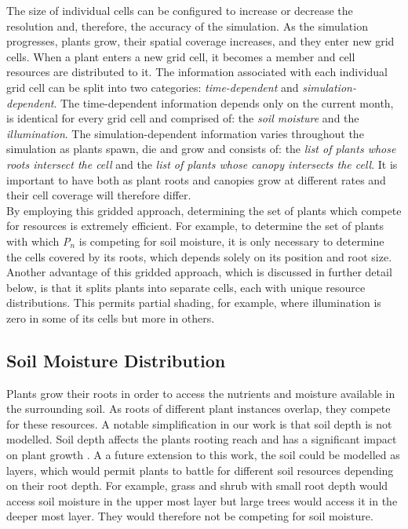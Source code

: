 The size of individual cells can be configured to increase or decrease the resolution and, therefore, the accuracy of the simulation. As the simulation progresses, plants grow, their spatial coverage increases, and they enter new grid cells. When a plant enters a new grid cell, it becomes a member and cell resources are distributed to it. The information associated with each individual grid cell can be split into two categories: \textit{time-dependent} and \textit{simulation-dependent}. The time-dependent information depends only on the current month, is identical for every grid cell and comprised of: the \textit{soil moisture} and the \textit{illumination}. The simulation-dependent information varies throughout the simulation as plants spawn, die and grow and consists of: the \textit{list of plants whose roots intersect the cell} and the \textit{list of plants whose canopy intersects the cell}. It is important to have both as plant roots and canopies grow at different rates and their cell coverage will therefore differ. \\
By employing this gridded approach, determining the set of plants which compete for resources is extremely efficient. For example, to determine the set of plants with which \textit{P$_{n}$} is competing for soil moisture, it is only necessary to determine the cells covered by its roots, which depends solely on its position and root size.\\
Another advantage of this gridded approach, which is discussed in further detail below, is that it splits plants into separate cells, each with unique resource distributions. This permits partial shading, for example, where illumination is zero in some of its cells but more in others. \\

\subsection{Soil Moisture Distribution} \label{subsec:humidity_distribution}

Plants grow their roots in order to access the nutrients and moisture available in the surrounding soil. As roots of different plant instances overlap, they compete for these resources. A notable simplification in our work is that soil depth is not modelled. Soil depth affects the plants rooting reach and has a significant impact on plant growth \cite{Fourcaud2008}. A a future extension to this work, the soil could be modelled as layers, which would permit plants to battle for different soil resources depending on their root depth. For example, grass and shrub with small root depth would access soil moisture in the upper most layer but large trees would access it in the deeper most layer. They would therefore not be competing for soil moisture. \\

